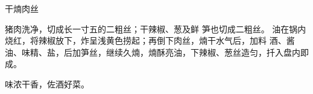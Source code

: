 \begin{recipe}{干煵肉丝}

\ingredients


\cooking

\step 猪肉洗净，切成长一寸五的二粗丝；干辣椒、葱及鲜 笋也切成二粗丝。
\step 油在锅内烧红，将辣椒放下，炸呈浅黄色捞起；再倒下肉丝，煵干水气后，加料
酒、酱油、味精、盐，后加笋丝，继续久煵，煵酥亮油，下辣椒、葱丝造匀，扦入盘内即
成。

\notes

味浓干香，佐酒好菜。

\end{recipe}


